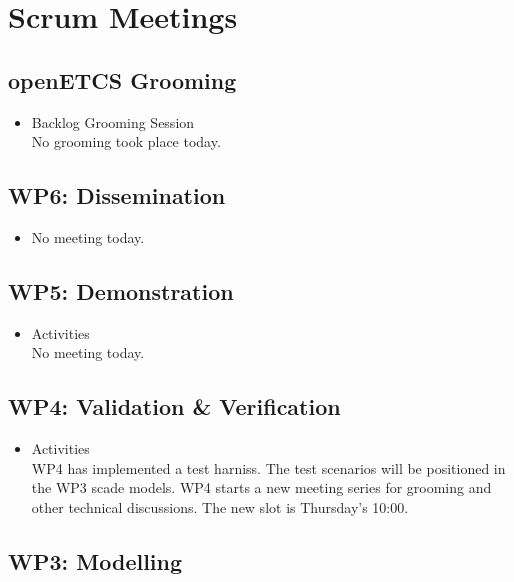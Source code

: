 \documentclass[a4paper, 11pt]{article}
\begin{document}

\section{Scrum Meetings}

\subsection{openETCS Grooming}
\begin{itemize}
\item Backlog Grooming Session\\
No grooming took place today.

\end{itemize}

\subsection{WP6: Dissemination}
\begin{itemize}

\item No meeting today.
\end{itemize}

\subsection{WP5: Demonstration}

\begin{itemize}
\item Activities\\
No meeting today.

\end{itemize}

\subsection{WP4: Validation \& Verification}
\begin{itemize}
\item Activities\\
WP4 has implemented a test harniss. The test scenarios will be positioned in the WP3 scade models.
WP4 starts a new meeting series for grooming and other technical discussions. The new slot is  Thursday's 10:00. 
\end{itemize}

\subsection{WP3: Modelling}
\end{document}
